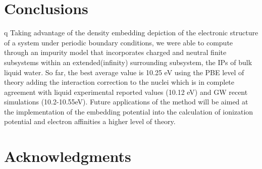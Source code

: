 \documentclass[12pt,a4paper]{article}
\begin{document}
\section{Conclusions}
q
Taking advantage of the density embedding depiction of the electronic structure of a system under periodic boundary conditions, we were able to 
compute through an impurity model that incorporates charged and neutral finite subsystems within an extended(infinity) surrounding subsystem, 
the IPs of bulk liquid water. So far, the best average value is 10.25 eV using the PBE level of theory adding the interaction correction to the 
nuclei which is in complete agreement with liquid experimental reported values (10.12 eV) and GW recent simulations (10.2-10.55eV). 
Future applications of the method will be aimed at the implementation of the embedding potential into the calculation of ionization potential
and electron affinities a higher level of theory. \\

\nocite{*}

\printbibliography

\section{Acknowledgments}
\end{document}
